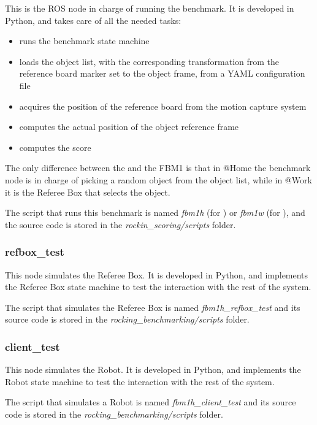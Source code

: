 \documentclass[a4paper]{article}
\begin{document}
This is the ROS node in charge of running the benchmark.
It is developed in Python, and takes care of all the needed tasks:

\begin{itemize}
  \item runs the benchmark state machine
  \item loads the object list, with the corresponding transformation from the reference board marker set to the object frame, from a YAML configuration file
  \item acquires the position of the reference board from the motion capture system
  \item computes the actual position of the object reference frame
  \item computes the score
\end{itemize}

The only difference between the \ro@Home and the \ro@Work FBM1 is that in @Home the benchmark node is in charge of picking a random object from the object list, while in @Work it is the Referee Box that selects the object.

The script that runs this benchmark is named \emph{fbm1h} (for \ro@Home) or \emph{fbm1w} (for \ro@Work), and the source code is stored in the \emph{rockin\_scoring/scripts} folder.


\subsubsection{refbox\_test}

This node simulates the Referee Box.
It is developed in Python, and implements the Referee Box state machine to test the interaction with the rest of the system.

The script that simulates the Referee Box is named \emph{fbm1h\_refbox\_test} and its source code is stored in the \emph{rocking\_benchmarking/scripts} folder.

\subsubsection{client\_test}

This node simulates the Robot.
It is developed in Python, and implements the Robot state machine to test the interaction with the rest of the system.

The script that simulates a Robot is named \emph{fbm1h\_client\_test} and its source code is stored in the \emph{rocking\_benchmarking/scripts} folder.
\end{document}
